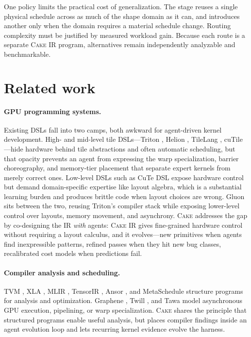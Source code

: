 \documentclass[11pt]{article}
\newcommand{\cake}{\textsc{Cake}}
\newcommand{\cakeir}{\textsc{Cake IR}}
\begin{document}
One policy limits the practical cost of generalization. The stage reuses a
single physical schedule across as much of the shape domain as it can, and
introduces another only when the domain requires a material schedule change.
Routing complexity must be justified by measured workload gain. Because each
route is a separate \cakeir{} program, alternatives remain independently
analyzable and benchmarkable.

\section{Related work}
\label{sec:related}

\paragraph{GPU programming systems.}
Existing DSLs fall into two camps, both awkward for agent-driven kernel
development. High- and mid-level tile DSLs---Triton \cite{tillet2019triton},
Helion \cite{helion2026}, TileLang \cite{ye2025tilelang}, cuTile
\cite{cutile2026}---hide hardware behind tile abstractions and often automatic
scheduling, but that opacity prevents an agent from expressing the warp
specialization, barrier choreography, and memory-tier placement that separate
expert kernels from merely correct ones. Low-level DSLs such as CuTe DSL
\cite{cutedsl2025} expose hardware control but demand domain-specific expertise
like layout algebra, which is a substantial learning burden and produces brittle
code when layout choices are wrong. Gluon \cite{gluon2026} sits between the two,
reusing Triton's compiler stack while exposing lower-level control over layouts,
memory movement, and asynchrony. \cake{} addresses the gap by co-designing the
IR \emph{with} agents: \cakeir{} gives fine-grained hardware control without
requiring a layout calculus, and it evolves---new primitives when agents find
inexpressible patterns, refined passes when they hit new bug classes,
recalibrated cost models when predictions fail.

\paragraph{Compiler analysis and scheduling.}
TVM \cite{chen2018tvm}, XLA \cite{xla2017}, MLIR \cite{lattner2021mlir},
TensorIR \cite{feng2023tensorir}, Ansor \cite{zheng2020ansor}, and MetaSchedule
\cite{shao2022metaschedule} structure programs for analysis and optimization.
Graphene \cite{hagedorn2023graphene,hagedorn2026time}, Twill
\cite{soi2024twill}, and Tawa \cite{chen2025tawa} model asynchronous GPU
execution, pipelining, or warp specialization. \cake{} shares the principle that
structured programs enable useful analysis, but places compiler findings inside
an agent evolution loop and lets recurring kernel evidence evolve the harness.
\end{document}
